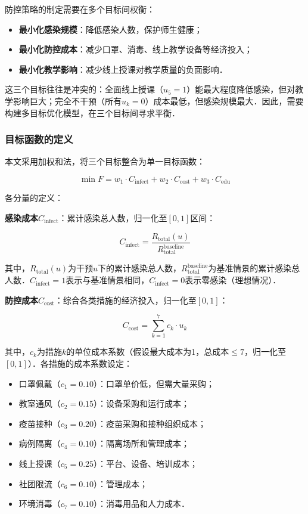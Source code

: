 防控策略的制定需要在多个目标间权衡：

\begin{itemize}
  \item \textbf{最小化感染规模}：降低感染人数，保护师生健康；
  \item \textbf{最小化防控成本}：减少口罩、消毒、线上教学设备等经济投入；
  \item \textbf{最小化教学影响}：减少线上授课对教学质量的负面影响．
\end{itemize}

这三个目标往往是冲突的：全面线上授课（$u_5=1$）能最大程度降低感染，但对教学影响巨大；完全不干预（所有$u_k=0$）成本最低，但感染规模最大．因此，需要构建多目标优化模型，在三个目标间寻求平衡．

\subsubsection{目标函数的定义}

本文采用加权和法，将三个目标整合为单一目标函数：

\begin{equation}
  \min F = w_1 \cdot C_{\text{infect}} + w_2 \cdot C_{\text{cost}} + w_3 \cdot C_{\text{edu}}
  \label{eq:objective}
\end{equation}

各分量的定义：

\textbf{感染成本}$C_{\text{infect}}$：累计感染总人数，归一化至$[0, 1]$区间：

\begin{equation}
  C_{\text{infect}} = \frac{R_{\text{total}}(u)}{R_{\text{total}}^{\text{baseline}}}
\end{equation}

其中，$R_{\text{total}}(u)$为干预$u$下的累计感染总人数，$R_{\text{total}}^{\text{baseline}}$为基准情景的累计感染总人数．$C_{\text{infect}} = 1$表示与基准情景相同，$C_{\text{infect}} = 0$表示零感染（理想情况）．

\textbf{防控成本}$C_{\text{cost}}$：综合各类措施的经济投入，归一化至$[0, 1]$：

\begin{equation}
  C_{\text{cost}} = \sum_{k=1}^{7} c_k \cdot u_k
\end{equation}

其中，$c_k$为措施$k$的单位成本系数（假设最大成本为1，总成本$\leq 7$，归一化至$[0, 1]$）．各措施的成本系数设定：

\begin{itemize}
  \item 口罩佩戴（$c_1 = 0.10$）：口罩单价低，但需大量采购；
  \item 教室通风（$c_2 = 0.15$）：设备采购和运行成本；
  \item 疫苗接种（$c_3 = 0.20$）：疫苗采购和接种组织成本；
  \item 病例隔离（$c_4 = 0.10$）：隔离场所和管理成本；
  \item 线上授课（$c_5 = 0.25$）：平台、设备、培训成本；
  \item 社团限流（$c_6 = 0.10$）：管理成本；
  \item 环境消毒（$c_7 = 0.10$）：消毒用品和人力成本．
\end{itemize}

